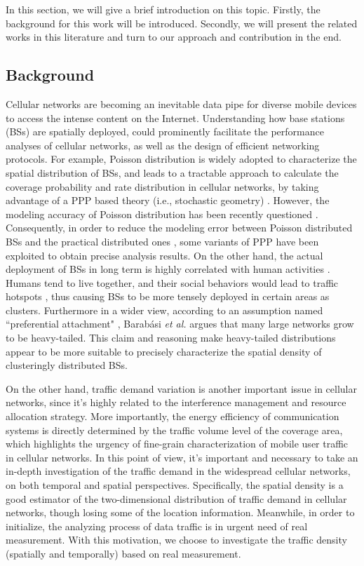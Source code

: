 In this section, we will give a brief introduction on this topic. Firstly, the background for this work will be introduced. Secondly, we will present the related works in this literature and turn to our approach and contribution in the end.

\subsection{Background}
Cellular networks are becoming an inevitable data pipe for diverse mobile devices to access the intense content on the Internet. Understanding how base stations (BSs) are spatially deployed, could prominently facilitate the performance analyses of cellular networks, as well as the design of efficient networking protocols. For example, Poisson distribution is widely adopted to characterize the spatial distribution of BSs, and leads to a tractable approach to calculate the coverage probability and rate distribution in cellular networks, by taking advantage of a PPP based theory (i.e., stochastic geometry) \cite{andrews2011tractable,haenggi2009stochastic}. However, the modeling accuracy of Poisson distribution has been recently questioned \cite{zhou2014two}. Consequently, in order to reduce the modeling error between Poisson distributed BSs and the practical distributed ones \cite{deng2014ginibre}, some variants of PPP have been exploited to obtain precise analysis results. On the other hand, the actual deployment of BSs in long term is highly correlated with human activities \cite{zhou2013human,zhang2013base}. Humans tend to live together, and their social behaviors would lead to traffic hotspots \cite{zhang2013base}, thus causing BSs to be more tensely deployed in certain areas as clusters. Furthermore in a wider view, according to an assumption named ``preferential attachment" \cite{barabasi1999emergence}, Barab\'asi \textit{et al.} argues that many large networks grow to be heavy-tailed. This claim and reasoning make heavy-tailed distributions appear to be more suitable to precisely characterize the spatial density of clusteringly distributed BSs.

On the other hand, traffic demand variation is another important issue in cellular networks, since it's highly related to the interference management and resource allocation strategy. More importantly, the energy efficiency of communication systems is directly determined by the traffic volume level of the coverage area, which highlights the urgency of fine-grain characterization of mobile user traffic in cellular networks. In this point of view, it's important and necessary to take an in-depth investigation of the traffic demand in the widespread cellular networks, on both temporal and spatial perspectives. Specifically, the spatial density is a good estimator of the two-dimensional distribution of traffic demand in cellular networks, though losing some of the location information. Meanwhile, in order to initialize, the analyzing process of data traffic is in urgent need of real measurement. With this motivation, we choose to investigate the traffic density (spatially and temporally) based on real measurement.

